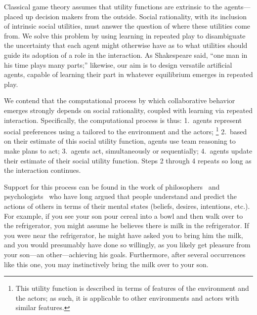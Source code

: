 Classical game theory assumes that utility functions are extrinsic to the 
agents---placed up decision makers from the outside. Social rationality, with its
inclusion of intrinsic social utilities, must answer the question of where these
utilities come from.
We solve this problem by using learning in repeated play
to disambiguate the uncertainty that each agent might otherwise have
as to what utilities should guide its adoption of a role in the interaction.
As
Shakespeare said, ``one man in his time plays many parts;'' likewise,
our aim is to design versatile artificial agents, capable of learning
their part in whatever equilibrium emerges in repeated play.

We contend that the computational process by which collaborative
behavior emerges strongly depends on social rationality, coupled with
learning via repeated interaction.
%
Specifically, the computational process is thus:
1.~agents represent social preferences using a 
tailored to the environment and the actors;%
\footnote{This utility function is described in terms of features of the environment and the actors;
as such, it is applicable to other environments and actors with similar features.}
2.~based on their estimate of this social utility function, agents use team reasoning to make plans to act;
3.~agents act, simultaneously or sequentially;
4.~agents update their estimate of their social utility function.
Steps 2 through 4 repeats so long as the interaction continues.

Support for this process can be found in the work of
philosophers~\cite{dennett87} and psychologists~\cite{heider44} who
have long argued that people understand and predict the actions of
others in terms of their  mental states (beliefs, desires, intentions,
etc.).  For example, if you see your son pour cereal into a bowl and
then walk over to the refrigerator, you might assume he believes there
is milk in the refrigerator.  If you were near the refrigerator, he
might have asked you to bring him the milk, and you would presumably
have done so willingly, as you likely get pleasure from your son---an
other---achieving his goals.  Furthermore, after several occurrences
like this one, you may instinctively bring the milk over to your son.


